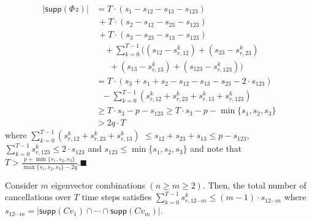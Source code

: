 \documentclass[../thesis.tex]{subfiles}
\begin{document}
\begin{equation}
\begin{aligned}
	\lvert \textsf{supp}(\Phi z) \rvert  &=  T \cdot(s_1 - s_{12} - s_{13} - s_{123}) \\&~ + T \cdot(s_2 - s_{12} - s_{23} - s_{123}) \\&~ + T \cdot(s_3 - s_{23} - s_{13} - s_{123}) \\ 
	& \quad+ \sum_{k=0}^ {T-1} \bigg (  (s_{12} - s_{r,12}^k ) + (s_{23} - s_{r,23}^k) \\ &~~~~~~~+ (s_{13} - s_{r,13}^k) + ( s_{123} - s_{r,123}^k) \bigg) \\
	&= T \cdot (s_3 + s_1 + s_2 - s_{12} - s_{13} - s_{23} - 2 \cdot s_{123}) \\&~~~ - \sum_{k=0}^{T-1} ( s_{r,12}^k + s_{r,23}^k + s_{r,13}^k  + s_{r,123}^k ) \\
	& \ge T \cdot s_3 - p - s_{123} \ge T \cdot s_3 - p - \min \{ s_1, s_2, s_3 \} \\
	& > 2q \cdot T
		\nonumber 
\end{aligned}
\end{equation}
where
$\sum_{k=0}^{T-1} (s_{r,12}^k + s_{r,23}^k + s_{r,13}^k   )$ $\le s_{12} + s_{23} + s_{13} $$ \le p - s_{123}$, $\sum_{k=0}^{T-1} s_{r,123}^k \le 2 \cdot s_{123}$ and $ s_{123} \le \min \{ s_1, s_2, s_3 \}$ and note that $T > \frac { p + \min \{ s_1, s_2, s_3 \}} { \max \{s_1, s_2, s_3 \} - 2q }$.\hfill$\blacksquare$\\



\begin{proposition} \label{prop:m_vec}
Consider $m$ eigenvector combinations $(n\ge m \ge 2)$. Then, the total number of cancellations over $T$ time steps satisfies $\sum_{k=0}^{T-1} s_{r,12 \cdots m}^k \le (m-1)\cdot s_{12 \cdots m}$ where $s_{12\cdots m} = \lvert \textsf{supp} (Cv_1) \cap \cdots \cap \textsf{supp} (Cv_m) \rvert$.
\end{proposition}
\end{document}
